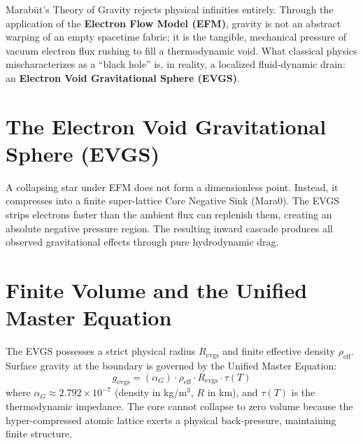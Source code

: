 \documentclass[11pt, a4paper]{article}
\begin{document}
  Marab\={u}t's Theory of Gravity rejects physical infinities entirely. Through the application of the \textbf{Electron Flow Model (EFM)}, gravity is not an abstract warping of an empty spacetime fabric; it is the tangible, mechanical pressure of vacuum electron flux rushing to fill a thermodynamic void. What classical physics mischaracterizes as a ``black hole'' is, in reality, a localized fluid-dynamic drain: an \textbf{Electron Void Gravitational Sphere (EVGS)}.

\section{The Electron Void Gravitational Sphere (EVGS)}
  A collapsing star under EFM does not form a dimensionless point. Instead, it compresses into a finite super-lattice Core Negative Sink (Mara0). The EVGS strips electrons faster than the ambient flux can replenish them, creating an absolute negative pressure region. The resulting inward cascade produces all observed gravitational effects through pure hydrodynamic drag.

\section{Finite Volume and the Unified Master Equation}
  The EVGS possesses a strict physical radius $R_{\text{evgs}}$ and finite effective density $\rho_{\text{eff}}$. Surface gravity at the boundary is governed by the Unified Master Equation:
  \begin{equation}
    g_{\text{evgs}} = (\alpha_G) \cdot \rho_{\text{eff}} \cdot R_{\text{evgs}} \cdot \tau(T)
  \end{equation}
  where $\alpha_G \approx 2.792 \times 10^{-7}$ (density in kg/m$^3$, $R$ in km), and $\tau(T)$ is the thermodynamic impedance. The core cannot collapse to zero volume because the hyper-compressed atomic lattice exerts a physical back-pressure, maintaining finite structure.
\end{document}
